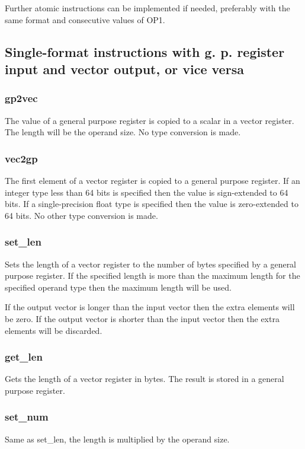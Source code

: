 \documentclass[forwardcom.tex]{subfiles}
\begin{document}
Further atomic instructions can be implemented if needed, preferably with the same format and consecutive values of OP1.

\subsection{Single-format instructions with g. p. register input and vector output, or vice versa}

\subsubsection{gp2vec}
The value of a general purpose register is copied to a scalar in a vector register. The length will be the operand size. No type conversion is made.

\subsubsection{vec2gp}
The first element of a vector register is copied to a general purpose register. If an integer type less than 64 bits is specified then the value is sign-extended to 64 bits. If a single-precision float type is specified then the value is zero-extended to 64 bits. No other type conversion is made.

\subsubsection{set\_len}
Sets the length of a vector register to the number of bytes specified by a general purpose register. If the specified length is more than the maximum length for the specified operand type then the maximum length will be used.
\vspace{2mm}

If the output vector is longer than the input vector then the extra elements will be zero. If the output vector is shorter than the input vector then the extra elements will be discarded. 

\subsubsection{get\_len}
Gets the length of a vector register in bytes. The result is stored in a general purpose register.

\subsubsection{set\_num}
Same as set\_len, the length is multiplied by the operand size.
\end{document}

